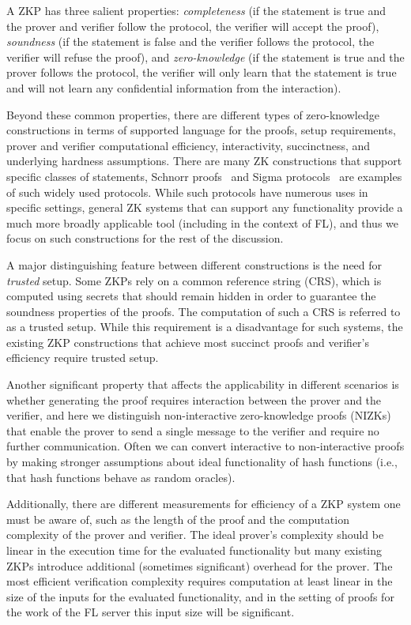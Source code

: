 A ZKP has three salient properties: \emph{completeness} (if the statement is true and the prover and verifier follow the protocol, the verifier will accept the proof), \emph{soundness} (if the statement is false and the verifier follows the protocol, the verifier will refuse the proof), and \emph{zero-knowledge} (if the statement is true and the prover follows the protocol, the verifier will only learn that the statement is true and will not learn any confidential information from the interaction).

Beyond these common properties, there are different types of zero-knowledge constructions in terms of supported language for the proofs, setup requirements, prover and verifier computational efficiency, interactivity, succinctness, and underlying hardness assumptions. There are many ZK constructions that support specific classes of statements, Schnorr proofs~\cite{Schnorr:1990:EIS:111563.111628} and Sigma protocols~\cite{DamgaardSigma} are examples of such widely used protocols. While such protocols have numerous uses in specific settings, general ZK systems that can support any functionality provide a much more broadly applicable tool (including in the context of FL), and thus we focus on such constructions for the rest of the discussion.

A major distinguishing feature between different constructions is the need for \emph{trusted} setup. Some ZKPs rely on a common reference string (CRS), which is computed using secrets that should remain hidden in order to guarantee the soundness properties of the proofs. The computation of such a CRS is referred to as a trusted setup. While this requirement is a disadvantage for such systems, the existing ZKP constructions that achieve most succinct proofs and verifier's efficiency require trusted setup. 

Another significant property that affects the applicability in different scenarios is whether generating the proof requires interaction between the prover and the verifier, and here we distinguish non-interactive zero-knowledge proofs (NIZKs) that enable the prover to send a single message to the verifier and require no further communication. Often we can convert interactive to non-interactive proofs by making stronger assumptions about ideal functionality of hash functions (i.e., that hash functions behave as random oracles).

Additionally, there are different measurements for efficiency of a ZKP system one must be aware of, such as the length of the proof and the computation complexity of the prover and verifier. The ideal prover's complexity should be linear in the execution time for the evaluated functionality but many existing ZKPs introduce additional (sometimes significant) overhead for the prover. The most efficient verification complexity requires computation at least linear in the size of the inputs for the evaluated functionality, and in the setting of proofs for the work of the FL server this input size will be significant.

